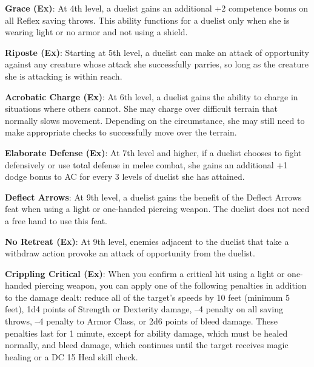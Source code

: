 \textbf{Grace (Ex)}: At 4th level, a duelist gains an additional +2 competence bonus on all Reflex saving throws. This ability functions for a duelist only when she is wearing light or no armor and not using a shield.
				
\textbf{Riposte (Ex)}: Starting at 5th level, a duelist can make an attack of opportunity against any creature whose attack she successfully parries, so long as the creature she is attacking is within reach.
				
\textbf{Acrobatic Charge (Ex)}: At 6th level, a duelist gains the ability to charge in situations where others cannot. She may charge over difficult terrain that normally slows movement. Depending on the circumstance, she may still need to make appropriate checks to successfully move over the terrain.
				
\textbf{Elaborate Defense (Ex)}: At 7th level and higher, if a duelist chooses to fight defensively or use total defense in melee combat, she gains an additional +1 dodge bonus to AC for every 3 levels of duelist she has attained.
				
\textbf{Deflect Arrows}: At 9th level, a duelist gains the benefit of the Deflect Arrows feat when using a light or one-handed piercing weapon. The duelist does not need a free hand to use this feat.
				
\textbf{No Retreat (Ex)}: At 9th level, enemies adjacent to the duelist that take a withdraw action provoke an attack of opportunity from the duelist.
				
\textbf{Crippling Critical (Ex)}: When you confirm a critical hit using a light or one-handed piercing weapon, you can apply one of the following penalties in addition to the damage dealt: reduce all of the target's speeds by 10 feet (minimum 5 feet), 1d4 points of Strength or Dexterity damage, --4 penalty on all saving throws, --4 penalty to Armor Class, or 2d6 points of bleed damage. These penalties last for 1 minute, except for ability damage, which must be healed normally, and bleed damage, which continues until the target receives magic healing or a DC 15 Heal skill check.
        	
